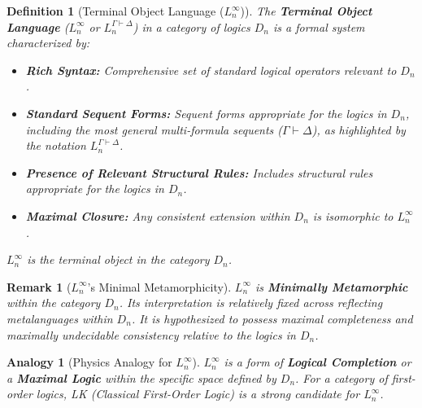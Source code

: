 \documentclass{article}
\newtheorem{definition}{Definition}[section] %
\newtheorem{remark}{Remark}[section] %
\newtheorem{analogy}{Analogy}[section] %
\begin{document}
																																	\begin{definition}[Terminal Object Language ($L^\infty_n$)]
																																		The \textbf{Terminal Object Language} ($L^\infty_n$ or $L^{\Gamma\vdash\Delta}_n$) in a category of logics $D_n$ is a formal system characterized by:
																																		\begin{itemize}
																																			\item \textbf{Rich Syntax:} Comprehensive set of standard logical operators relevant to $D_n$.
																																			\item \textbf{Standard Sequent Forms:} Sequent forms appropriate for the logics in $D_n$, including the most general multi-formula sequents ($\Gamma \vdash \Delta$), as highlighted by the notation $L^{\Gamma\vdash\Delta}_n$.
																																			\item \textbf{Presence of Relevant Structural Rules:} Includes structural rules appropriate for the logics in $D_n$.
																																			\item \textbf{Maximal Closure:} Any consistent extension within $D_n$ is isomorphic to $L^\infty_n$.
																																			\end{itemize}
																																				$L^\infty_n$ is the terminal object in the category $D_n$.
																																			\end{definition}
																																			
																																			\begin{remark}[$L^\infty_n$'s Minimal Metamorphicity]
																																				$L^\infty_n$ is \textbf{Minimally Metamorphic} within the category $D_n$. Its interpretation is relatively fixed across reflecting metalanguages within $D_n$. It is hypothesized to possess maximal completeness and maximally undecidable consistency relative to the logics in $D_n$.
																																				\end{remark}
																																					
																																					\begin{analogy}[Physics Analogy for $L^\infty_n$]
																																						$L^\infty_n$ is a form of \textbf{Logical Completion} or a \textbf{Maximal Logic} within the specific space defined by $D_n$. For a category of first-order logics, LK (Classical First-Order Logic) is a strong candidate for $L^\infty_n$.
																																						\end{analogy}
																																							
\end{document}

